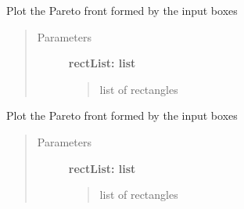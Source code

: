 \documentclass[letterpaper,10pt,english]{sphinxmanual}
\begin{document}
\begin{fulllineitems}
Plot the Pareto front formed by the input boxes
\begin{quote}\begin{description}
\item[{Parameters}] \leavevmode
\textbf{rectList: list}
\begin{quote}

list of rectangles
\end{quote}

\end{description}\end{quote}

\end{fulllineitems}



\begin{fulllineitems}
Plot the Pareto front formed by the input boxes
\begin{quote}\begin{description}
\item[{Parameters}] \leavevmode
\textbf{rectList: list}
\begin{quote}

list of rectangles
\end{quote}

\end{description}\end{quote}

\end{fulllineitems}
\end{document}
